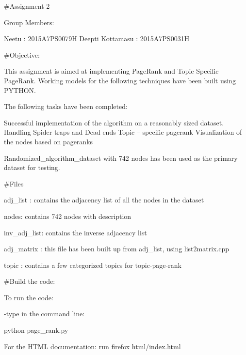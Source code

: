 \#\+Assignment 2

Group Members\+:

Neetu \+: 2015\+A7\+P\+S0079H Deepti Kottamasu \+: 2015\+A7\+P\+S0031H

\#\+Objective\+:

This assignment is aimed at implementing Page\+Rank and Topic Specific Page\+Rank. Working models for the following techniques have been built using P\+Y\+T\+H\+ON.

The following tasks have been completed\+:

Successful implementation of the algorithm on a reasonably sized dataset. Handling Spider traps and Dead ends Topic – specific pagerank Visualization of the nodes based on pageranks

Randomized\+\_\+algorithm\+\_\+dataset with 742 nodes has been used as the primary dataset for testing.

\#\+Files

adj\+\_\+list \+: contains the adjacency list of all the nodes in the dataset

nodes\+: contains 742 nodes with description

inv\+\_\+adj\+\_\+list\+: contains the inverse adjacency list

adj\+\_\+matrix \+: this file has been built up from adj\+\_\+list, using list2matrix.\+cpp

topic \+: contains a few categorized topics for topic-\/page-\/rank

\#\+Build the code\+:

To run the code\+:

-\/type in the command line\+:

python page\+\_\+rank.\+py

For the H\+T\+ML documentation\+: run firefox html/index.\+html 